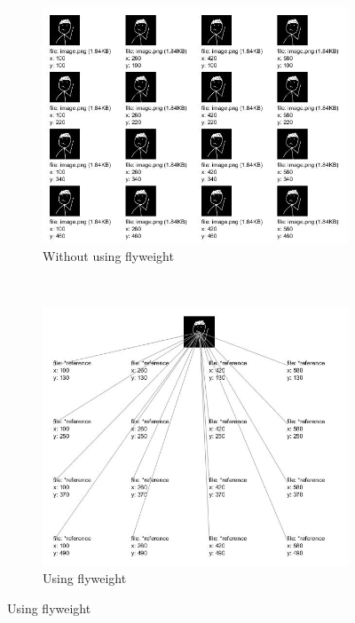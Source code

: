 \begin{multicols}{2}
\begin{figure}[H]
	\centering
	\begin{subfigure}[b]{0.49\textwidth}
		\centering
        \includegraphics[width=\textwidth]{assets/noflyweight}
        \caption{Without using flyweight}
        \label{fig:no-flyweight}
	\end{subfigure}
	~
	\begin{subfigure}[b]{0.49\textwidth}
		\centering
        \includegraphics[width=\textwidth]{assets/flyweight}
        \caption{Using flyweight}
        \label{fig:with-flyweight}
	\end{subfigure}


\end{figure}
\end{multicols}
